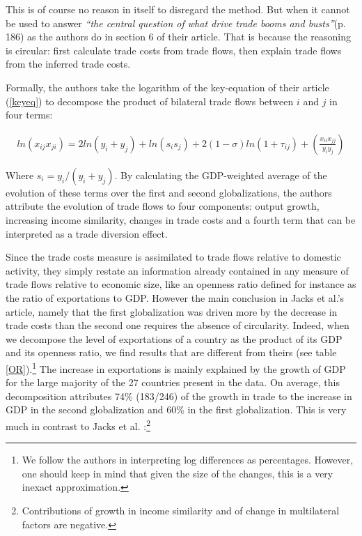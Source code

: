 \documentclass{article}
\begin{document}
This is of course no reason in itself to disregard the method.
But when it cannot be used to answer \emph{``the central
question of what drive trade booms and busts''}(p. 186) as the
authors do in section 6 of their article. That is because the reasoning is
circular: first calculate trade costs from trade flows, then
explain trade flows from the inferred trade costs.

Formally, the authors take the logarithm of the key-equation of
their article (\ref{keyeq}) to decompose the product of
bilateral trade flows between $i$ and $j$ in four terms:

\begin{eqnarray}
ln (x_{ij}x_{ji})= 2 ln(y_i + y_j)+ ln (s_i s_j) + 2(1-\sigma)ln(1+\tau_{ij})+ \left(\frac{x_{ii} x_{jj}}{y_i y_j}\right)
\end{eqnarray}

Where $s_i=y_i/(y_i+y_j)$. By calculating the GDP-weighted
average of the evolution of these terms over the first and
second globalizations, the authors attribute the evolution of
trade flows to four components: output growth, increasing
income similarity, changes in trade costs and a fourth term
that can be interpreted as a trade diversion effect.

Since the trade costs measure is assimilated to trade flows
relative to domestic activity, they simply restate
 an information already contained in any measure of
trade flows relative to economic size, like an openness ratio
defined for instance as the ratio of exportations to GDP.
However the main conclusion in Jacks et al.'s article, namely
that the first globalization was driven more by the decrease in
trade costs than the second one requires the absence of circularity.
Indeed, when we decompose the level of
exportations of a country as the product of its GDP and its
openness ratio, we find results that are different from theirs (see table \ref{OR}).\footnote{We follow
the authors in interpreting log differences as percentages. However, one should keep in mind that given the
size of the changes, this is a very inexact approximation.} The increase in exportations is mainly explained by the growth of
GDP for the large majority of the 27 countries present in the
data. On average, this decomposition attributes 74\% (183/246) of
the growth in trade to the increase in GDP in the second
globalization and 60\% in the first globalization. This is very much in contrast to 
Jacks et al. :\footnote{Contributions of growth in income
similarity and of change in multilateral factors are negative.}
 
\end{document}
